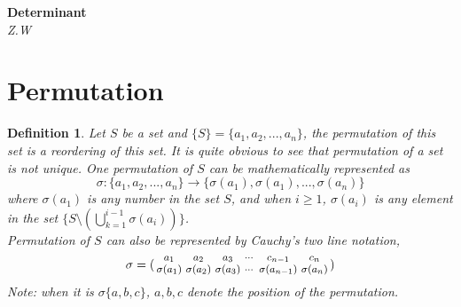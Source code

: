 \documentclass[12pt,letterpaper]{article}
\newtheorem{mydef}{Definition}
\begin{document}
\begin{center}
    \huge\textbf{Determinant} \\[10pt]
    \large\textit{Z.W}  \\[20pt]
\end{center}
\section{Permutation}
\begin{mydef}\label{def:def444}
Let $S$ be a set and $\{S\}=\{a_1,a_2,...,a_n\}$, the permutation of this set is a reordering of this set. It is quite obvious to see that permutation of a set is not unique. One permutation of $S$ can be mathematically represented as 
$$\sigma : \{a_1,a_2,...,a_n\} \longrightarrow \{\sigma(a_1),\sigma(a_1),...,\sigma(a_n)\}$$
where  $\sigma(a_1)$ is any number in the set $S$, and when $i \geqslant 1$, $\sigma(a_i)$ is any element in the set $\{S \setminus(\bigcup_{k=1}^{i-1}\sigma(a_i))\}$.
\\
\newline Permutation of $S$ can also be represented by Cauchy's two line notation,
$$\sigma= \large(\begin{smallmatrix}
    a_1 & a_2 & a_3 & \cdots & c_{n-1} & c_n \\
    \sigma(a_1) & \sigma(a_2) & \sigma(a_3) & \cdots &  \sigma(a_{n-1})  & \sigma(a_n)
  \end{smallmatrix}\large)$$
 Note: when it is $\sigma\{a,b,c\}$, $a,b,c$ denote the position of the permutation.\\[10pt]
\end{mydef}
\end{document}
